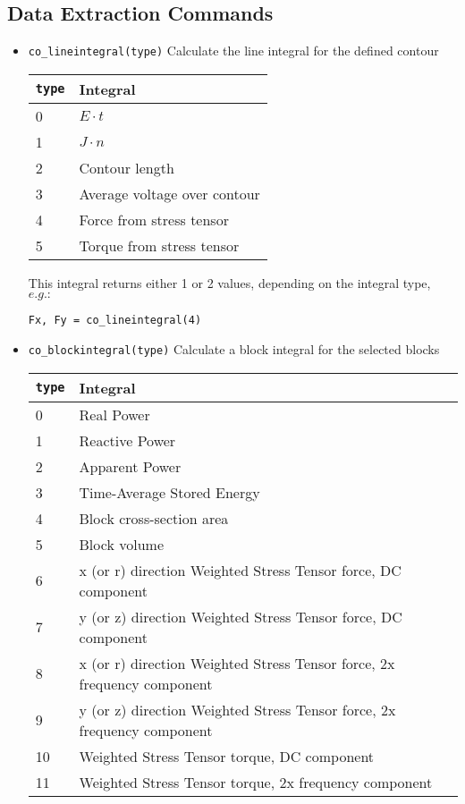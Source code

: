 \subsection{Data Extraction Commands}
\begin{itemize}

\item \texttt{co\_lineintegral(type)} Calculate the line integral for the defined contour


\begin{tabular}{ll}
\texttt{type} & Integral \\ \hline
 0 & $E \cdot t$ \\
 1 & $J \cdot n$ \\
 2 & Contour length \\
 3 & Average voltage over contour \\
 4 & Force from stress tensor \\
 5 & Torque from stress tensor
\end{tabular}

This integral returns either 1 or 2 values, depending on the
integral type, $e.g.:$

\texttt{Fx, Fy = co\_lineintegral(4)}

\item \texttt{co\_blockintegral(type)} Calculate a block integral for the selected
blocks

\begin{tabular}{ll}
\texttt{type} & Integral \\ \hline
	 0  & Real Power \\
	 1  & Reactive Power \\
	 2  & Apparent Power \\
	 3  & Time-Average Stored Energy \\
	 4  & Block cross-section area \\
	 5  & Block volume \\
	 6  & x (or r) direction Weighted Stress Tensor force, DC component \\
	 7  & y (or z) direction Weighted Stress Tensor force, DC component \\
	 8  & x (or r) direction Weighted Stress Tensor force, 2x frequency component \\
	 9  & y (or z) direction Weighted Stress Tensor force, 2x frequency component \\
	 10 & Weighted Stress Tensor torque, DC component \\
	 11 & Weighted Stress Tensor torque, 2x frequency component
\end{tabular}


\end{itemize}
